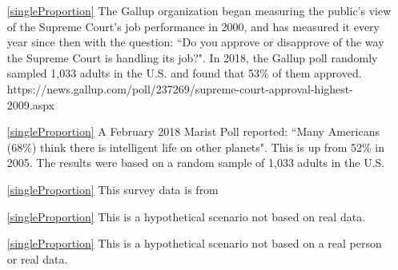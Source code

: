 \D{\newpage}



\begin{itemize}

\item[\ref{singleProportion}]
    The Gallup organization began measuring the public's view of the Supreme Court's job performance in 2000, and has measured it every year since then with the question: ``Do you approve or disapprove of the way the Supreme Court is handling its job?".  In 2018, the Gallup poll randomly sampled 1,033 adults in the U.S. and found that 53\% of them approved. \\   
        {https://news.gallup.com/poll/237269/supreme-court-approval-highest-2009.aspx}

\item[\ref{singleProportion}]
    A February 2018 Marist Poll reported: ``Many Americans (68\%) think there is intelligent life on other planets".
    This is up from 52\% in 2005.
    The results were based on a random sample of 1,033 adults in the U.S. \\

\item[\ref{singleProportion}]
    This survey data is from\\

\item[\ref{singleProportion}]
    This is a hypothetical scenario not based on real data.

\item[\ref{singleProportion}]
    This is a hypothetical scenario not based on a real person
    or real data.


\end{itemize}
